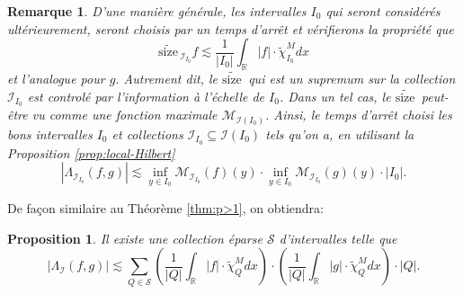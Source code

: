\documentclass[11pt]{amsart}
\newtheorem{proposition}[theorem]{Proposition}
\newtheorem*{remark}{Remarque}
\newcommand{\sssize}{\widetilde{\text{size}\,}}
\newcommand{\rr}{\mathbb}
\newcommand{\ii}{\mathscr}
\newcommand{\ic}{\mathcal}
\newcommand{\ci}{\tilde{\chi}}
\begin{document}
\begin{remark}
D'une mani\`ere g\'en\'erale, les intervalles $I_0$ qui seront consid\'er\'es ult\'erieurement, seront choisis par un temps d'arr\^et et v\'erifierons la propri\'et\'e que
$$ \sssize_{\ii I_{I_0}} f \lesssim \frac{1}{|I_0|} \int_{\rr R} |f| \cdot \ci_{I_0}^M dx $$
et l'analogue pour $g$. Autrement dit, le $\sssize$ qui est un supremum sur la collection $\ii I_{I_0}$ est control\'e par l'information \`a l'\'echelle de $I_0$.
Dans un tel cas, le $\sssize$ peut-\^etre vu comme une fonction maximale $\ic M_{\ii I \left( I_0 \right)}$. Ainsi, le temps d'arr\^et choisi les bons intervalles $I_0$ et  collections $\ii I_{I_0} \subseteq \ii I(I_0)$ tels qu'on a, en utilisant la Proposition \ref{prop:local-Hilbert}
$$|\Lambda_{\ii I _{ I_0} }(f, g)| \lesssim \inf_{y \in I_0}\ic M_{\ii I _{ I_0}}(f)(y) \cdot \inf_{y \in I_0}\ic M_{\ii I _{ I_0}}(g)(y) \cdot |I_0|.$$
\end{remark}


De fa\c{c}on similaire au Th\'eor\`eme \ref{thm:p>1}, on obtiendra:
\begin{proposition}
\label{prop:sparse-Hilbert-trans}
Il existe une collection \'eparse $\ic S$ d'intervalles  telle que
\begin{equation}
\label{eq:sparseHilbert}
\big|\Lambda_{\ii I}(f, g)\big| \lesssim  \sum_{Q \in \ic S}  \left(\frac{1}{|Q|} \int_{\rr R} |f|\cdot \ci_{Q}^M dx \right) \cdot \left(\frac{1}{|Q|} \int_{\rr R} |g|\cdot \ci_{Q}^M dx \right) \cdot |Q|.
\end{equation}
\end{proposition}
\end{document}
